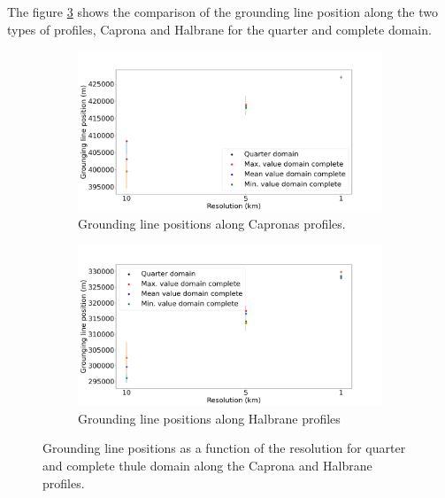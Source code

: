 \documentclass{article}
\begin{document}
The figure \ref{Grounding_lines__caprona_halbrane_comparison} shows the comparison of the grounding line position along the two types of profiles, Caprona and Halbrane for the quarter and complete domain. 

\begin{figure}[!h]
	\centering
	\begin{subfigure}{.5\textwidth}
		\centering
		\includegraphics[width=1.1\linewidth]{../fig/Figure_THULE_GLpositions_Capronas.png}
		\caption{Grounding line positions along Capronas profiles.}
		\label{Thule_Capronas}
	\end{subfigure}%
	\begin{subfigure}{.5\textwidth}
		\centering
		\includegraphics[width=1.1\linewidth]{../fig/Figure_THULE_GLpositions_Halbranes.png}
		\caption{Grounding line positions along Halbrane profiles}
		\label{Thule_halbranes}
	\end{subfigure}
	\caption{Grounding line positions as a function of the resolution for quarter and complete thule domain along the Caprona and Halbrane profiles.}
	\label{Grounding_lines__caprona_halbrane_comparison}
\end{figure}
\end{document}
